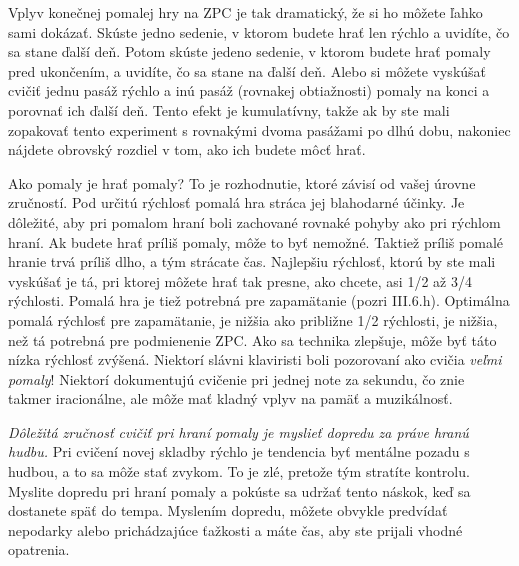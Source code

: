 Vplyv konečnej pomalej hry na ZPC je tak dramatický, že si ho môžete ľahko sami dokázať. Skúste jedno sedenie, v ktorom budete hrať len rýchlo a uvidíte, čo sa stane ďalší deň. Potom skúste jedeno sedenie, v ktorom budete hrať pomaly pred ukončením, a uvidíte, čo sa stane na ďalší deň. Alebo si môžete vyskúšať cvičiť jednu pasáž rýchlo a inú pasáž (rovnakej obtiažnosti) pomaly na konci a porovnať ich ďalší deň. Tento efekt je kumulatívny, takže ak by ste mali zopakovať tento experiment s rovnakými dvoma pasážami po dlhú dobu, nakoniec nájdete obrovský rozdiel v tom, ako ich budete môcť hrať.

Ako pomaly je hrať pomaly? To je rozhodnutie, ktoré závisí od vašej úrovne zručností. Pod určitú rýchlosť pomalá hra stráca jej blahodarné účinky. Je dôležité, aby pri pomalom hraní boli zachované rovnaké pohyby ako pri rýchlom hraní. Ak budete hrať príliš pomaly, môže to byť nemožné. Taktiež príliš pomalé hranie trvá príliš dlho, a tým strácate čas. Najlepšiu rýchlosť, ktorú by ste mali vyskúšať je tá, pri ktorej môžete hrať tak presne, ako chcete, asi 1/2 až 3/4 rýchlosti. Pomalá hra je tiež potrebná pre zapamätanie (pozri III.6.h). Optimálna pomalá rýchlosť pre zapamätanie, je nižšia ako približne 1/2 rýchlosti, je nižšia, než tá potrebná pre podmienenie ZPC. Ako sa technika zlepšuje, môže byť táto nízka rýchlosť zvýšená. Niektorí slávni klaviristi boli pozorovaní ako cvičia \textit{veľmi pomaly}! Niektorí dokumentujú cvičenie pri jednej note za sekundu, čo znie takmer iracionálne, ale môže mať kladný vplyv na pamäť a muzikálnosť.

\emph{Dôležitá zručnosť cvičiť pri hraní pomaly je myslieť dopredu za práve hranú hudbu.} Pri cvičení novej skladby rýchlo je tendencia byť mentálne pozadu s hudbou, a to sa môže stať zvykom. To je zlé, pretože tým stratíte kontrolu. Myslite dopredu pri hraní pomaly a pokúste sa udržať tento náskok, keď sa dostanete späť do tempa. Myslením dopredu, môžete obvykle predvídať nepodarky alebo prichádzajúce ťažkosti a máte čas, aby ste prijali vhodné opatrenia.

